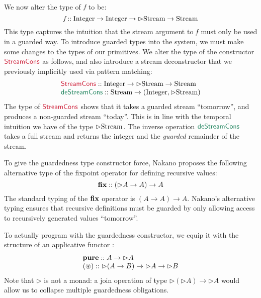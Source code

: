We now alter the type of $\textit{f}$ to be:
\begin{displaymath}
  \textit{f} :: \textrm{Integer} \to \textrm{Integer} \to \rhd\textrm{Stream} \to \textrm{Stream}
\end{displaymath}
This type captures the intuition that the stream argument to
$\textit{f}$ must only be used in a guarded way. To introduce
guarded types into the system, we must make some changes to the types
of our primitives. We alter the type of the constructor
$\cons{StreamCons}$ as follows, and also introduce a stream
deconstructor that we previously implicitly used via pattern matching:
\begin{displaymath}
  \begin{array}{l}
    \cons{StreamCons} :: \tyname{Integer} \to \rhd\tyname{Stream} \to \tyname{Stream} \\
    \elim{deStreamCons} :: \tyname{Stream} \to (\tyname{Integer}, \rhd\tyname{Stream})
  \end{array}
\end{displaymath}
The type of $\cons{StreamCons}$ shows that it takes a guarded stream
``tomorrow'', and produces a non-guarded stream ``today''. This is in
line with the temporal intuition we have of the type
$\rhd\textrm{Stream}$. The inverse operation $\elim{deStreamCons}$
takes a full stream and returns the integer and the \emph{guarded}
remainder of the stream.

To give the guardedness type constructor force, Nakano proposes the
following alternative type of the fixpoint operator for defining
recursive values:
\begin{displaymath}
  \textbf{fix} :: (\rhd A \to A) \to A
\end{displaymath}
The standard typing of the $\textbf{fix}$ operator is $(A \to A) \to
A$. Nakano's alternative typing ensures that recursive definitions
must be guarded by only allowing access to recursively generated
values ``tomorrow''.

To actually program with the guardedness constructor, we equip it with
the structure of an applicative functor \cite{mcbride08applicative}:
\begin{displaymath}
  \begin{array}{l}
    \textbf{pure} :: A \to \rhd A \\
    \textbf{$(\circledast)$} :: \rhd (A \to B) \to \rhd A \to \rhd B
  \end{array}
\end{displaymath}
Note that $\rhd$ is not a monad: a join operation of type $\rhd(\rhd
A) \to \rhd A$ would allow us to collapse multiple guardedness
obligations.

